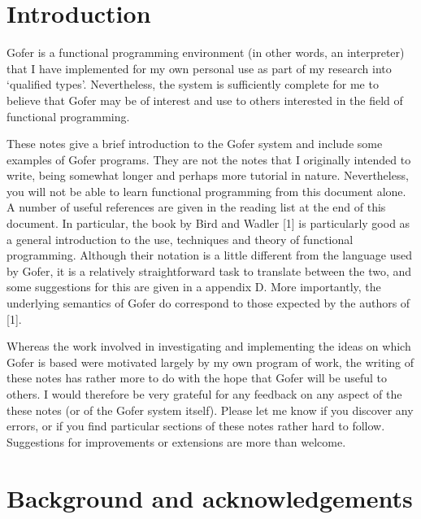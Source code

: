 \chapter{Introduction}

Gofer is a functional  programming  environment  (in  other  words,  an
interpreter) that I have implemented for my own personal use as part of
my research  into  `qualified  types'.   Nevertheless,  the  system  is
sufficiently complete for me to believe that Gofer may be  of  interest
and use to others interested in the field of functional programming.

These notes give a brief introduction to the Gofer system  and  include
some examples of Gofer  programs.   They  are  not  the  notes  that  I
originally intended to write, being somewhat longer  and  perhaps  more
tutorial in nature.  Nevertheless,  you  will  not  be  able  to  learn
functional programming from this document alone.  A  number  of  useful
references are given in the reading list at the end of  this  document.
In particular, the book by Bird and Wadler [1] is particularly good  as
a general introduction to the use, techniques and theory of  functional
programming.  Although their notation is  a  little  different from the
language used by Gofer, it is  a  relatively  straightforward  task  to
translate between the two, and some suggestions for this are given in a
appendix D.  More importantly, the underlying  semantics  of  Gofer  do
correspond to those expected by the authors of [1].

Whereas the work involved in investigating and implementing  the  ideas
on which Gofer is based were motivated largely by  my  own  program  of
work, the writing of these notes has rather more to do  with  the  hope
that Gofer will be  useful  to  others.   I  would  therefore  be  very
grateful for any feedback on any aspect of the these notes (or  of  the
Gofer system itself).  Please let me know if you discover  any  errors,
or if you find particular  sections  of  these  notes  rather  hard  to
follow.  Suggestions for  improvements  or  extensions  are  more  than
welcome.

\chapter{Background and acknowledgements}

